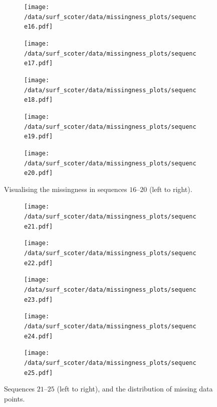 \begin{figure}[t]
	\begin{subfigure}[b]{0.2\textwidth}
		\centering
		\texttt{[image: /data/surf\_scoter/data/missingness\_plots/sequence16.pdf]}
	\end{subfigure}%
	\begin{subfigure}[b]{0.2\textwidth}
		\centering
		\texttt{[image: /data/surf\_scoter/data/missingness\_plots/sequence17.pdf]}
	\end{subfigure}%
	\begin{subfigure}[b]{0.2\textwidth}
		\centering
		\texttt{[image: /data/surf\_scoter/data/missingness\_plots/sequence18.pdf]}
	\end{subfigure}%
	\begin{subfigure}[b]{0.2\textwidth}
		\centering
		\texttt{[image: /data/surf\_scoter/data/missingness\_plots/sequence19.pdf]}
	\end{subfigure}%
	\begin{subfigure}[b]{0.2\textwidth}
		\centering
		\texttt{[image: /data/surf\_scoter/data/missingness\_plots/sequence20.pdf]}
	\end{subfigure}%
	\caption{Visualising the missingness in sequences $16$--$20$ (left to right).}
\end{figure}

\begin{figure}[b]
	\begin{subfigure}[b]{0.2\textwidth}
		\centering
		\texttt{[image: /data/surf\_scoter/data/missingness\_plots/sequence21.pdf]}
	\end{subfigure}%
	\begin{subfigure}[b]{0.2\textwidth}
		\centering
		\texttt{[image: /data/surf\_scoter/data/missingness\_plots/sequence22.pdf]}
	\end{subfigure}%
	\begin{subfigure}[b]{0.2\textwidth}
		\centering
		\texttt{[image: /data/surf\_scoter/data/missingness\_plots/sequence23.pdf]}
	\end{subfigure}%
	\begin{subfigure}[b]{0.2\textwidth}
		\centering
		\texttt{[image: /data/surf\_scoter/data/missingness\_plots/sequence24.pdf]}
	\end{subfigure}%
	\begin{subfigure}[b]{0.2\textwidth}
		\centering
		\texttt{[image: /data/surf\_scoter/data/missingness\_plots/sequence25.pdf]}
	\end{subfigure}%
	\caption{Sequences $21$--$25$ (left to right), and the distribution of missing data points.}
\end{figure}

